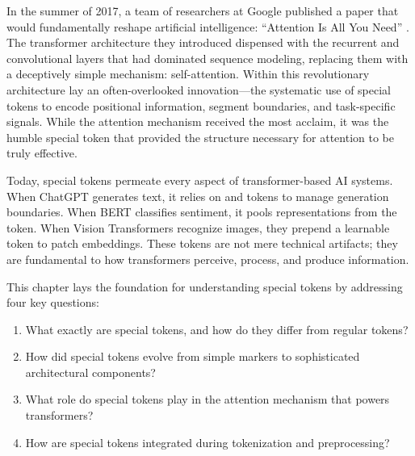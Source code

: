 In the summer of 2017, a team of researchers at Google published a paper that would fundamentally reshape artificial intelligence: ``Attention Is All You Need'' \citep{vaswani2017attention}. The transformer architecture they introduced dispensed with the recurrent and convolutional layers that had dominated sequence modeling, replacing them with a deceptively simple mechanism: self-attention. Within this revolutionary architecture lay an often-overlooked innovation---the systematic use of special tokens to encode positional information, segment boundaries, and task-specific signals. While the attention mechanism received the most acclaim, it was the humble special token that provided the structure necessary for attention to be truly effective.
\begin{comment}
Feedback: This is a great hook. To strengthen it, you could add a sentence that hints at why this "often-overlooked innovation" was so critical. For example: "While the attention mechanism received the most acclaim, it was the humble special token that provided the structure necessary for attention to be truly effective." This helps justify the book's focus right away.

STATUS: addressed - added justification for why special tokens were critical to attention mechanism's effectiveness
\end{comment}

Today, special tokens permeate every aspect of transformer-based AI systems. When ChatGPT generates text, it relies on \sos{} and \eos{} tokens to manage generation boundaries. When BERT classifies sentiment, it pools representations from the \cls{} token. When Vision Transformers recognize images, they prepend a learnable \cls{} token to patch embeddings. These tokens are not mere technical artifacts; they are fundamental to how transformers perceive, process, and produce information.

This chapter lays the foundation for understanding special tokens by addressing four key questions:
\begin{enumerate}
\item What exactly are special tokens, and how do they differ from regular tokens?
\item How did special tokens evolve from simple markers to sophisticated architectural components?
\item What role do special tokens play in the attention mechanism that powers transformers?
\item How are special tokens integrated during tokenization and preprocessing?
\end{enumerate}

